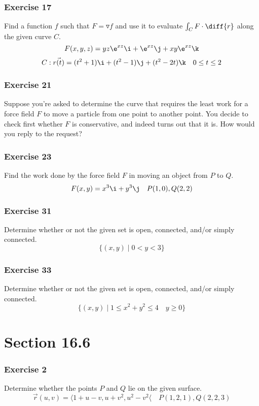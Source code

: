 \documentclass{math}
\begin{document}
\subsubsection*{Exercise 17}
Find a function \( f \) such that \( F = \triangledown f \) and use it to
evaluate \( \int_{C}F\cdot\diff{r} \) along the given curve \( C \).
\[ F(x,y,z) = yz\e^{xz}\i+\e^{xz}\j+xy\e^{xz}\k \]
\[ C: \vec{r(t)} = (t^2+1)\i+(t^2-1)\j+(t^2-2t)\k \quad 0\le t\le2 \]

\subsubsection*{Exercise 21}
Suppose you're asked to determine the curve that requires the least work for a
force field \( F \) to move a particle from one point to another point. You
decide to check first whether \( F \) is conservative, and indeed turns out that
it is. How would you reply to the request?

\subsubsection*{Exercise 23}
Find the work done by the force field \( F \) in moving an object from \( P \)
to \( Q \).
\[ F(x,y) = x^3\i+y^3\j \quad P(1,0),Q(2,2) \]

\subsubsection*{Exercise 31}
Determine whether or not the given set is open, connected, and/or simply
connected.
\[ \{(x,y)\mid0<y<3\} \]

\subsubsection*{Exercise 33}
Determine whether or not the given set is open, connected, and/or simply
connected.
\[ \{(x,y)\mid1\le x^2+y^2\le 4\quad y\ge0\} \]

\section*{Section 16.6}

\subsubsection*{Exercise 2}
Determine whether the points \( P \) and \( Q \) lie on the given surface.
\[ \vec{r}(u,v) = \langle1+u-v,u+v^2,u^2-v^2\langle \quad P(1,2,1),Q(2,2,3) \]
\end{document}

